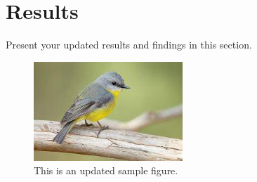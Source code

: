 \section{Results}
Present your updated results and findings in this section.

\begin{figure}[h]
    \centering
    \includegraphics[width=0.5\textwidth]{images/new/image.jpeg}
    \caption{This is an updated sample figure.}
    \label{fig:sample}
\end{figure}
